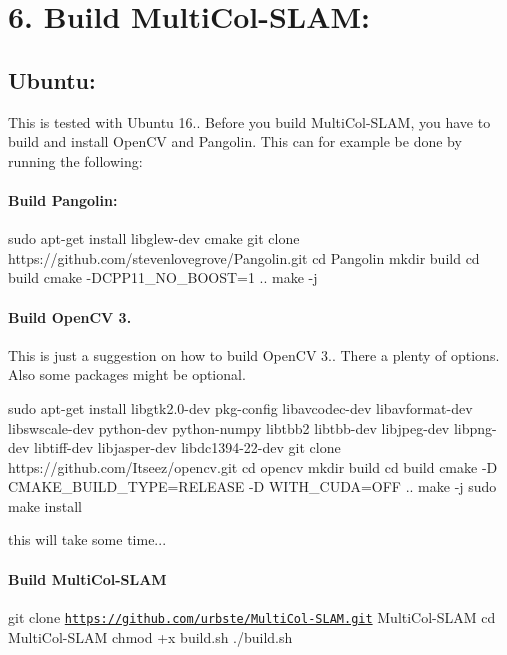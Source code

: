 \section*{6. Build Multi\+Col-\/\+S\+L\+AM\+:}

\subsection*{Ubuntu\+:}

This is tested with Ubuntu 16.. Before you build Multi\+Col-\/\+S\+L\+AM, you have to build and install Open\+CV and Pangolin. This can for example be done by running the following\+:

\paragraph*{Build Pangolin\+:}

\begin{DoxyVerb}sudo apt-get install libglew-dev cmake
git clone https://github.com/stevenlovegrove/Pangolin.git
cd Pangolin
mkdir build
cd build
cmake -DCPP11_NO_BOOST=1 ..
make -j
\end{DoxyVerb}


\paragraph*{Build Open\+CV 3.}

This is just a suggestion on how to build Open\+CV 3.. There a plenty of options. Also some packages might be optional. \begin{DoxyVerb}sudo apt-get install libgtk2.0-dev pkg-config libavcodec-dev libavformat-dev libswscale-dev python-dev python-numpy libtbb2 libtbb-dev libjpeg-dev libpng-dev libtiff-dev libjasper-dev libdc1394-22-dev
git clone https://github.com/Itseez/opencv.git
cd opencv
mkdir build
cd build
cmake -D CMAKE_BUILD_TYPE=RELEASE -D WITH_CUDA=OFF ..
make -j
sudo make install
\end{DoxyVerb}
 this will take some time...

\paragraph*{Build Multi\+Col-\/\+S\+L\+AM}

git clone \href{https://github.com/urbste/MultiCol-SLAM.git}{\tt https\+://github.\+com/urbste/\+Multi\+Col-\/\+S\+L\+A\+M.\+git} Multi\+Col-\/\+S\+L\+AM cd Multi\+Col-\/\+S\+L\+AM chmod +x build.\+sh ./build.sh

